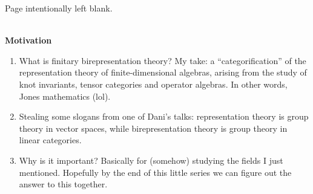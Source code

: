 \newpage

\renewcommand\thesection{R}
\begingroup
\setlength{\emergencystretch}{.5em}
\printbibliography[heading=none]
\endgroup
\newpage

\vspace*{\fill}
\hfill Page intentionally left blank. \hfill
\vspace*{\fill}
\newpage

\noindent\\\textbf{Motivation}
\begin{enumerate}[label=$\bullet$, leftmargin=1\parindent]
\item What is finitary birepresentation theory? My take: a ``categorification'' of the representation theory of finite-dimensional algebras, arising from the study of knot invariants, tensor categories and operator algebras. In other words, Jones mathematics (lol).
\item Stealing some slogans from one of Dani's talks: representation theory is group theory in vector spaces, while birepresentation theory is group theory in linear categories.
\item Why is it important? Basically for (somehow) studying the fields I just mentioned. Hopefully by the end of this little series we can figure out the answer to this together.\\
\end{enumerate}

